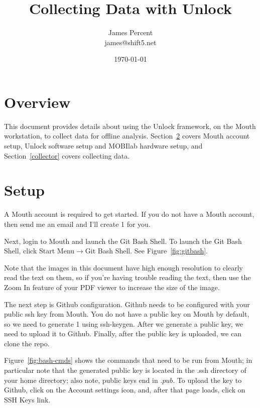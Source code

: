 \documentclass[11pt]{article}
\begin{document}
\title{\textbf{Collecting Data with Unlock}}
\author{James Percent \\
  james@shift5.net}
\date{\today}
\parskip 11pt
\parindent 0pt


\maketitle


\section{Overview}

This document provides details about using the Unlock framework, on the Mouth workstation, to collect data for offline analysis.  Section~\ref{unlock} covers Mouth account setup, Unlock software setup and MOBIlab hardware setup, and Section~\ref{collector} covers collecting data.

\section{Setup}\label{unlock}

A Mouth account is required to get started.  If you do not have a Mouth account, then send me an email and I'll create 1 for you.  

Next, login to Mouth and launch the Git Bash Shell.  To launch the Git Bash Shell, click Start Menu$\rightarrow$Git Bash Shell.  See Figure~\ref{fig:gitbash}.  

Note that the images in this document have high enough resolution to clearly read the text on them, so if you're having trouble reading the text, then use the Zoom In feature of your PDF viewer to increase the size of the image.

The next step is Github configuration.  Github needs to be configured with your public ssh key from Mouth.  You do not have a public key on Mouth by default, so we need to generate 1 using ssh-keygen.  After we generate a public key, we need to upload it to Github.  Finally, after the public key is uploaded, we can clone the repo.

Figure~\ref{fig:bash-cmds} shows the commands that need to be run from Mouth; in particular note that the generated public key is located in the .ssh directory of your home directory; also note, public keys end in $.pub$.  To upload the key to Github, click on the Account settings icon, and, after that page loads, click on SSH Keys link.
\end{document}

